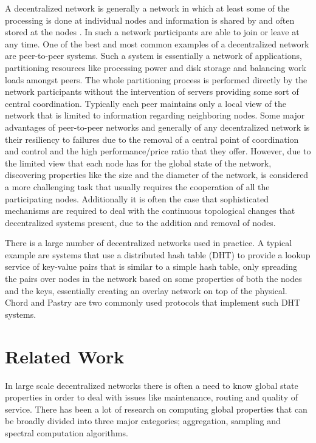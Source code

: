 \documentclass[MSc]{icldt}
\begin{document}
A decentralized network is generally a network in which at least some of the processing is done at individual nodes and information is shared by and often stored at the nodes \cite{parker2003mcgraw}. In such a network participants are able to join or leave at any time. One of the best and most common examples of a decentralized network are peer-to-peer systems. Such a system is essentially a network of applications, partitioning resources like processing power and disk storage and balancing work loads amongst peers. The whole partitioning process is performed directly by the network participants without the intervention of servers providing some sort of central coordination. Typically each peer maintains only a local view of the network that is limited to information regarding neighboring nodes. Some major advantages of peer-to-peer networks and generally of any decentralized network is their resiliency to failures due to the removal of a central point of coordination and control and the high performance/price ratio that they offer. However, due to the limited view that each node has for the global state of the network, discovering properties like the size and the diameter of the network, is considered a more challenging task that usually requires the cooperation of all the participating nodes. Additionally it is often the case that sophisticated mechanisms are required to deal with the continuous topological changes that decentralized systems present, due to the addition and removal of nodes.

There is a large number of decentralized networks used in practice. A typical example are systems that use a distributed hash table (DHT) to provide a lookup service of key-value pairs that is similar to a simple hash table, only spreading the pairs over nodes in the network based on some properties of both the nodes and the keys, essentially creating an overlay network on top of the physical. Chord \cite{Stoica:2001:CSP:964723.383071} and Pastry \cite{Rowstron:2001:PSD:646591.697650} are two commonly used protocols that implement such DHT systems. 

\section{Related Work}

In large scale decentralized networks there is often a need to know global state properties in order to deal with issues like maintenance, routing and quality of service. There has been a lot of research on computing global properties that can be broadly divided into three major categories; aggregation, sampling and spectral computation algorithms.
\end{document}
